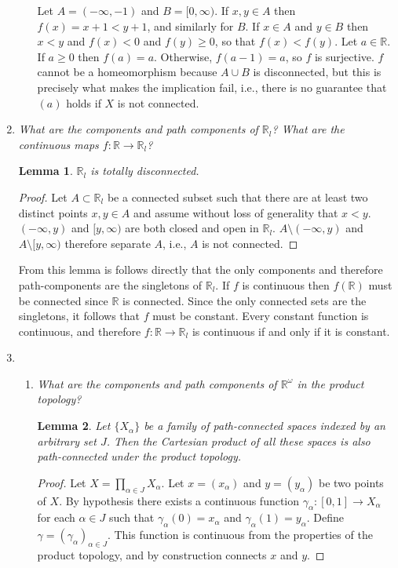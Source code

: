 \documentclass[10pt]{article}
\newcommand{\R}{\mathbb{R}}
\newtheorem{lemma}{Lemma}
\begin{document}
\begin{enumerate}
\begin{enumerate}
Let $A = (-\infty, -1)$ and $B = [0, \infty)$.  If $x,y \in A$ then $f(x) = x+1 < y+1$, and similarly for $B$.  If $x \in A$ and $y \in B$ then $x < y$ and $f(x) < 0$ and $f(y) \geq 0$, so that $f(x) < f(y)$.  Let $a \in \R$.  If $a \geq 0$ then $f(a) = a$.  Otherwise, $f(a-1) = a$, so $f$ is surjective.  $f$ cannot be a homeomorphism because $A \cup B$ is disconnected, but this is precisely what makes the implication fail, i.e., there is no guarantee that $(a)$ holds if $X$ is not connected.

\end{enumerate}

\item \emph{What are the components and path components of $\R_l$?  What are the continuous maps $f: \R \rightarrow \R_l$?}

\begin{lemma}\label{lower_lim_disconnected}$\R_l$ is totally disconnected.
\end{lemma}
\begin{proof}
Let $A \subset \R_l$ be a connected subset such that there are at least two distinct points $x,y \in A$ and assume without loss of generality that $x < y$.  $(-\infty, y)$ and $[y, \infty)$ are both closed and open in $\R_l$.  $A \setminus (-\infty, y)$ and $A \setminus [y, \infty)$ therefore separate $A$, i.e., $A$ is not connected.
\end{proof}

From this lemma is follows directly that the only components and therefore path-components are the singletons of $\R_l$.  If $f$ is continuous then $f(\R)$ must be connected since $\R$ is connected.  Since the only connected sets are the singletons, it follows that $f$ must be constant.  Every constant function is continuous, and therefore $f: \R \rightarrow \R_l$ is continuous if and only if it is constant.

\item
\begin{enumerate}
\item \emph{What are the components and path components of $\R^\omega$ in the product topology?}

\begin{lemma}\label{prod_path_connected} Let $\{X_\alpha\}$ be a family of path-connected spaces indexed by an arbitrary set $J$.  Then the Cartesian product of all these spaces is also path-connected under the product topology.
\end{lemma}
\begin{proof}Let $X = \prod_{\alpha \in J} X_\alpha$.  Let $x = (x_\alpha)$ and $y = (y_\alpha)$ be two points of $X$.  By hypothesis there exists a continuous function $\gamma_\alpha: [0,1] \rightarrow X_\alpha$ for each $\alpha \in J$ such that $\gamma_\alpha(0) = x_\alpha$ and $\gamma_\alpha(1) = y_\alpha$.  Define $\gamma = (\gamma_\alpha)_{\alpha \in J}$.  This function is continuous from the properties of the product topology, and by construction connects $x$ and $y$.
\end{proof}


\end{enumerate}
\end{enumerate}
\end{document}
